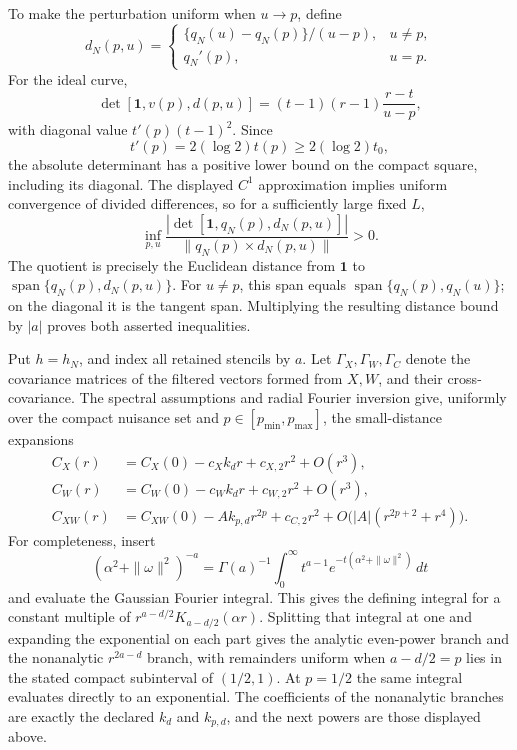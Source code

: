 To make the perturbation uniform when \(u\to p\), define
\[
 d_N(p,u)=
 \begin{cases}
 \{q_N(u)-q_N(p)\}/(u-p),&u\ne p,\\
 q_N'(p),&u=p.
 \end{cases}
\]
For the ideal curve,
\[
 \det[\mathbf 1,v(p),d(p,u)]
 =(t-1)(r-1)\frac{r-t}{u-p},
\]
with diagonal value \(t'(p)(t-1)^2\).  Since
\[
 t'(p)=2(\log 2)t(p)\ge 2(\log2)t_0,
\]
the absolute determinant has a positive lower bound on the compact square, including its diagonal.  The displayed \(C^1\) approximation implies uniform convergence of divided differences, so for a sufficiently large fixed \(L\),
\[
 \inf_{p,u}
 \frac{|\det[\mathbf 1,q_N(p),d_N(p,u)]|}
      {\|q_N(p)\times d_N(p,u)\|}>0.
\]
The quotient is precisely the Euclidean distance from \(\mathbf 1\) to \(\operatorname{span}\{q_N(p),d_N(p,u)\}\).  For \(u\ne p\), this span equals \(\operatorname{span}\{q_N(p),q_N(u)\}\); on the diagonal it is the tangent span.  Multiplying the resulting distance bound by \(|a|\) proves both asserted inequalities.

Put \(h=h_N\), and index all retained stencils by \(a\).  Let \(\Gamma_X,\Gamma_W,\Gamma_C\) denote the covariance matrices of the filtered vectors formed from \(X,W\), and their cross-covariance.  The spectral assumptions and radial Fourier inversion give, uniformly over the compact nuisance set and \(p\in[p_{\min},p_{\max}]\), the small-distance expansions
\[
 \begin{aligned}
 C_X(r)&=C_X(0)-c_Xk_dr+c_{X,2}r^2+O(r^3),\\
 C_W(r)&=C_W(0)-c_Wk_dr+c_{W,2}r^2+O(r^3),\\
 C_{XW}(r)&=C_{XW}(0)-Ak_{p,d}r^{2p}+c_{C,2}r^2
 +O\bigl(|A|(r^{2p+2}+r^4)\bigr).
 \end{aligned}
\]
For completeness, insert
\[
 (\alpha^2+\|\omega\|^2)^{-a}
 =\Gamma(a)^{-1}\int_0^\infty t^{a-1}
 e^{-t(\alpha^2+\|\omega\|^2)}\,dt
\]
and evaluate the Gaussian Fourier integral.  This gives the defining integral for a constant multiple of \(r^{a-d/2}K_{a-d/2}(\alpha r)\).  Splitting that integral at one and expanding the exponential on each part gives the analytic even-power branch and the nonanalytic \(r^{2a-d}\) branch, with remainders uniform when \(a-d/2=p\) lies in the stated compact subinterval of \((1/2,1)\).  At \(p=1/2\) the same integral evaluates directly to an exponential.  The coefficients of the nonanalytic branches are exactly the declared \(k_d\) and \(k_{p,d}\), and the next powers are those displayed above.

